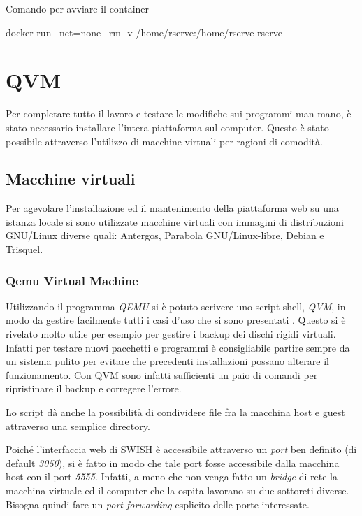 \documentclass[10pt,titlepage,twoside,a4paper]{report}
\newenvironment{code}{\singlespacing\captionsetup{type=listing}}{}
\begin{document}
\begin{code}
    \caption{Comando per avviare il container}
    \begin{shellcode*}{}
docker run --net=none --rm -v /home/rserve:/home/rserve rserve
    \end{shellcode*}
    \label{lst:dockerruncommand}
\end{code}


\section{QVM}
Per completare tutto il lavoro e testare le modifiche sui programmi man 
mano, è stato necessario installare l'intera piattaforma sul computer. 
Questo è stato possibile attraverso l'utilizzo di macchine virtuali 
per ragioni di comodità.

\subsection{Macchine virtuali}
Per agevolare l'installazione ed il mantenimento della piattaforma web su una 
istanza locale si sono utilizzate macchine virtuali con immagini di 
distribuzioni GNU/Linux diverse quali: Antergos, Parabola GNU/Linux-libre, 
Debian e Trisquel.

\subsubsection{Qemu Virtual Machine}
Utilizzando il programma \emph{QEMU} \cite{qemu} si è potuto scrivere uno
script shell, \emph{QVM}, in modo da gestire facilmente tutti i casi d'uso che 
si sono presentati \cite{qvm}. Questo si è rivelato molto utile per esempio per 
gestire i backup dei dischi rigidi virtuali. Infatti per testare nuovi 
pacchetti e programmi è consigliabile partire sempre da un sistema pulito
per evitare che precedenti installazioni possano alterare il funzionamento.
Con QVM sono infatti sufficienti un paio di comandi per ripristinare il 
backup e corregere l'errore.

Lo script dà anche la possibilità di condividere file fra la macchina host 
e guest attraverso una semplice directory.

Poiché l'interfaccia web di SWISH è accessibile attraverso un \emph{port} 
ben definito (di default \emph{3050}), si è fatto in modo che tale port 
fosse accessibile dalla macchina host con il port \emph{5555}. Infatti, a meno 
che non venga fatto un \emph{bridge} di rete la macchina virtuale ed il 
computer che la ospita lavorano su due sottoreti diverse. Bisogna quindi fare
un \emph{port forwarding} esplicito delle porte interessate.
\end{document}
